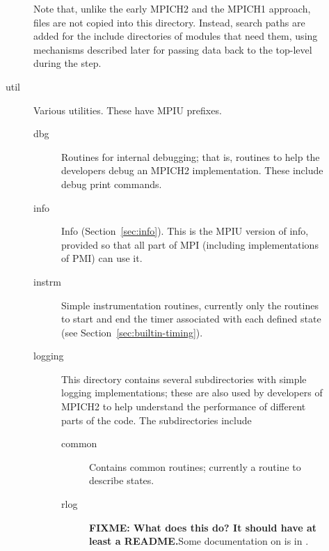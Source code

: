 \documentclass{article}
\def\fixme#1{\marginpar{FIXME:}\textbf{FIXME: #1}}
\begin{document}
\begin{description}
\begin{description}
  Note that, unlike the early MPICH2 and the MPICH1 approach, files are not 
  copied into this directory.  Instead, search paths are added for the 
  include directories of modules that need them, using mechanisms
  described later for passing data back to the top-level
   during the  step.
  \item[util]Various utilities.  These have MPIU prefixes.
    \begin{description}
    \item[dbg]Routines for internal debugging; that is, routines to
    help the developers debug an MPICH2 implementation.  These include
    debug print commands.
    \item[info]Info (Section~\ref{sec:info}).  This is the MPIU
    version of info, provided so 
    that all part of MPI (including implementations of PMI) can use
    it.
    \item[instrm]Simple instrumentation routines, currently only the 
      routines to start and end the timer associated with each defined
      state (see Section~\ref{sec:builtin-timing}).
    \item[logging]This directory contains several subdirectories with 
      simple logging implementations; these are also used by
      developers of MPICH2 to help understand the performance of
      different
      parts of the code.  The subdirectories include
    \begin{description}
      \item[common]Contains common routines; currently a routine to
      describe states.
      \item[rlog]\fixme{What does this do?  It should have at least a
      README.}Some documentation on  is in .


\end{description}
\end{description}
\end{description}
\end{description}
\end{document}
